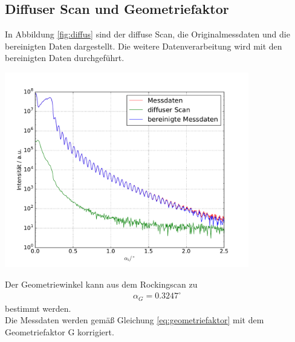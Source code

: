 \documentclass[captions=tableheading]{scrartcl}
\begin{document}
\subsection{Diffuser Scan und Geometriefaktor}
In Abbildung \ref{fig:diffus} sind der diffuse Scan, die Originalmessdaten und die bereinigten Daten dargestellt. Die weitere Datenverarbeitung wird mit den bereinigten Daten durchgeführt.
\begin{center}
	\includegraphics[width=0.8\textwidth]{images/rawdata.pdf}
	\label{fig:diffus}
\end{center}
Der Geometriewinkel kann aus dem Rockingscan zu
\begin{align*}
\alpha_G=0.3247^{\circ}
\end{align*}
bestimmt werden. \\
Die Messdaten werden gemäß Gleichung \ref{eq:geometriefaktor} mit dem Geometriefaktor G korrigiert.
\end{document}

